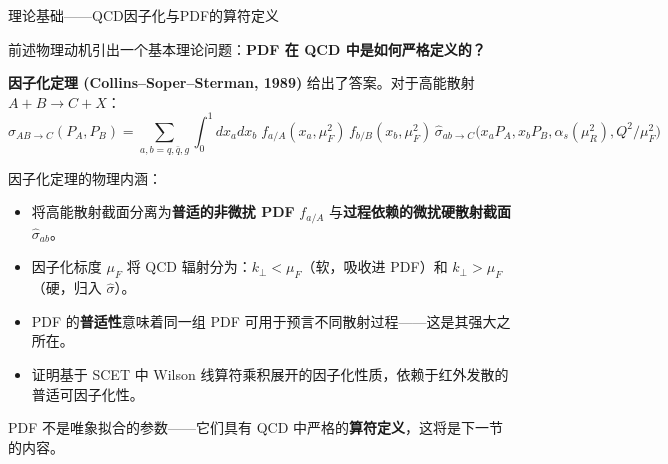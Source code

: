 \documentclass[10pt,aspectratio=169]{beamer}
\begin{document}
\begin{frame}{理论基础——QCD因子化与PDF的算符定义}

  前述物理动机引出一个基本理论问题：\textbf{PDF 在 QCD 中是如何严格定义的？}

  \textbf{因子化定理 (Collins--Soper--Sterman, 1989)} 给出了答案。对于高能散射 $A+B \to C+X$：
  {\footnotesize
  \begin{equation*}
    \sigma_{AB \to C}(P_A,P_B) = \sum_{a,b=q,\bar{q},g}
    \int_0^1\! dx_a dx_b\;
    f_{a/A}(x_a,\mu_F^2)\,
    f_{b/B}(x_b,\mu_F^2)\,
    \hat{\sigma}_{ab \to C}\!\bigl(x_a P_A, x_b P_B, \alpha_s(\mu_R^2), Q^2/\mu_F^2\bigr)
  \end{equation*}}

  因子化定理的物理内涵：
  \begin{itemize}
    \item 将高能散射截面分离为\textbf{普适的非微扰 PDF} $f_{a/A}$ 与\textbf{过程依赖的微扰硬散射截面} $\hat{\sigma}_{ab}$。
    \item 因子化标度 $\mu_F$ 将 QCD 辐射分为：$k_\perp < \mu_F$（软，吸收进 PDF）和 $k_\perp > \mu_F$（硬，归入 $\hat{\sigma}$）。
    \item PDF 的\textbf{普适性}意味着同一组 PDF 可用于预言不同散射过程——这是其强大之所在。
    \item 证明基于 SCET 中 Wilson 线算符乘积展开的因子化性质，依赖于红外发散的普适可因子化性。
  \end{itemize}

  PDF 不是唯象拟合的参数——它们具有 QCD 中严格的\textbf{算符定义}，这将是下一节的内容。\vspace{-4pt}
\end{frame}
\end{document}
